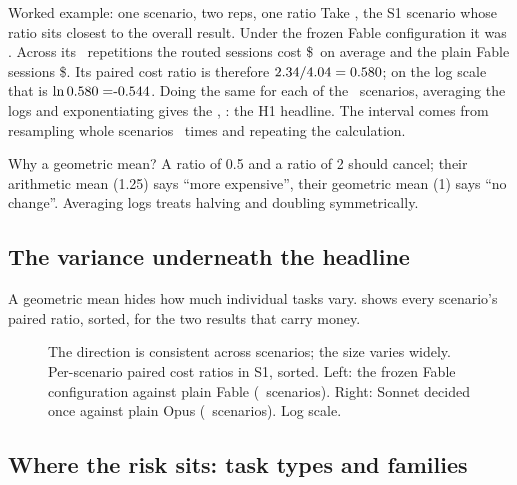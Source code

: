 \begin{casecard}{Worked example: one scenario, two reps, one ratio}
Take \code{\WxScen}, the S1 scenario whose ratio sits closest to the overall result. Under the frozen Fable
configuration it was \WxArm. Across its \WxReps\ repetitions the routed sessions cost \$\WxRouted\ on average and the
plain Fable sessions \$\WxPlain. Its paired cost ratio is therefore $2.34 / 4.04 = 0.580$; on the log scale
that is $\ln \WxRatio = \WxLog$. Doing the same for each of the \WxNScen\ scenarios, averaging the logs and
exponentiating gives the , \WxGM: the H1 headline. The interval comes from resampling whole
scenarios \SResamples\ times and repeating the calculation.
\end{casecard}

Why a geometric mean? A ratio of 0.5 and a ratio of 2 should cancel; their arithmetic mean (1.25) says ``more
expensive'', their geometric mean (1) says ``no change''. Averaging logs treats halving and doubling symmetrically.

\subsection{The variance underneath the headline}

A geometric mean hides how much individual tasks vary.  shows every scenario's paired ratio, sorted, for the two results that carry money.

\begin{figure}[htbp]
\centering
{}\par\smallskip

\caption{The direction is consistent across scenarios; the size varies widely. Per-scenario paired cost ratios in S1, sorted. Left: the frozen Fable configuration against plain Fable
(\PsFableN\ scenarios). Right: Sonnet decided once against plain Opus (\PsOpusN\ scenarios). Log scale.}
\label{fig:perscen}
\end{figure}

\subsection{Where the risk sits: task types and families}

